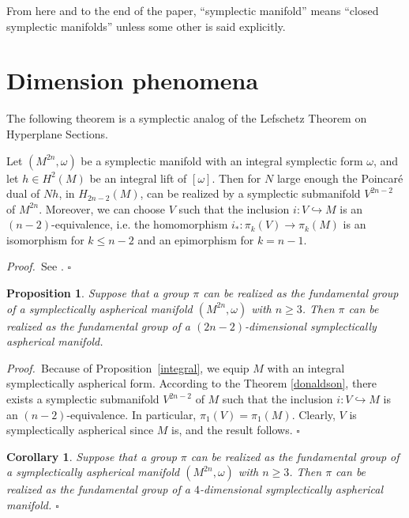 \documentclass[12pt, twoside]{amsart}
\theoremstyle{plain}
\newtheorem{prop}[theorem]{Proposition}
\newtheorem{cory}[theorem]{Corollary}
\theoremstyle{definition}
\numberwithin{equation}{section}
\def\hqed{\hfill\hfill$\square$}
\def\m{\medskip}
\def\p{{\it Proof.\ }}
\begin{document}
\m From here and to the end of the paper, ``symplectic manifold''  means 
``closed symplectic manifolds'' unless some other is said explicitly. 


\section{Dimension phenomena}\label{phen}

The following theorem is a symplectic analog of the Lefschetz Theorem on 
Hyperplane Sections.

\begin{theorem}
\label{donaldson}
 Let $(M^{2n},\omega)$ be a symplectic manifold with an integral 
symplectic form $\omega$, and let
$h\in H^2(M)$ be an integral lift of $[\omega]$. Then for $N$ large enough the
Poincar\'e dual of $Nh$, in $H_{2n-2}(M)$, can be realized by a symplectic
submanifold $V^{2n-2}$ of $M^{2n}$. Moreover, we can choose $V$ such that the
inclusion $i: V \hookrightarrow M$ is an $(n-2)$-equivalence, i.e. the
homomorphism $i_*: \pi_k(V) \to \pi_k(M)$ is an isomorphism for $k\le n-2$ and
an epimorphism for $k=n-1$. 
\end{theorem}

\p See \cite[Theorem 1 and Proposition 39]{D}.
\hqed

\begin{prop}
\label{down} 
Suppose that a group $\pi$ can be realized as the
fundamental group of a symplectically aspherical manifold $(M^{2n},\omega)$
with $n\ge 3$. Then $\pi$ can be realized as the fundamental group of a
$(2n-2)$-dimensional symplectically aspherical manifold. 
\end{prop}

\p  Because of Proposition~\ref{integral}, we equip $M$ with an integral 
symplectically aspherical form.  According to the Theorem 
\ref{donaldson}, there exists a symplectic submanifold $V^{2n-2}$ of $M$ such 
that the inclusion $i: V \hookrightarrow M$ is an $(n-2)$-equivalence. In 
particular, $\pi_1(V)=\pi_1(M)$.  Clearly, $V$ is symplectically aspherical 
since $M$ is, and the result follows.
\hqed

\begin{cory}
\label{four}
Suppose that a group $\pi$ can be realized as the
fundamental group of a symplectically aspherical manifold $(M^{2n},\omega)$
with $n\ge 3$. Then $\pi$ can be realized as the fundamental group of a
$4$-dimensional symplectically aspherical manifold. 
\hqed
\end{cory}
\end{document}
